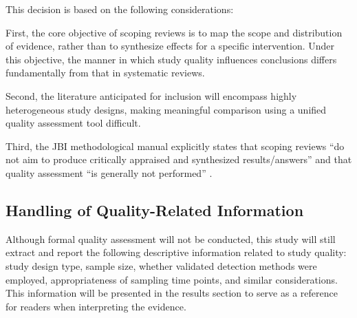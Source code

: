 \documentclass[12pt,a4paper]{article}
\begin{document}
This decision is based on the following considerations:

First, the core objective of scoping reviews is to map the scope and distribution of evidence, rather than to synthesize effects for a specific intervention. Under this objective, the manner in which study quality influences conclusions differs fundamentally from that in systematic reviews.

Second, the literature anticipated for inclusion will encompass highly heterogeneous study designs, making meaningful comparison using a unified quality assessment tool difficult.

Third, the JBI methodological manual explicitly states that scoping reviews ``do not aim to produce critically appraised and synthesized results/answers'' and that quality assessment ``is generally not performed'' \citep{peters2020jbi}.

\subsection{Handling of Quality-Related Information}

Although formal quality assessment will not be conducted, this study will still extract and report the following descriptive information related to study quality: study design type, sample size, whether validated detection methods were employed, appropriateness of sampling time points, and similar considerations. This information will be presented in the results section to serve as a reference for readers when interpreting the evidence.


\end{document}
